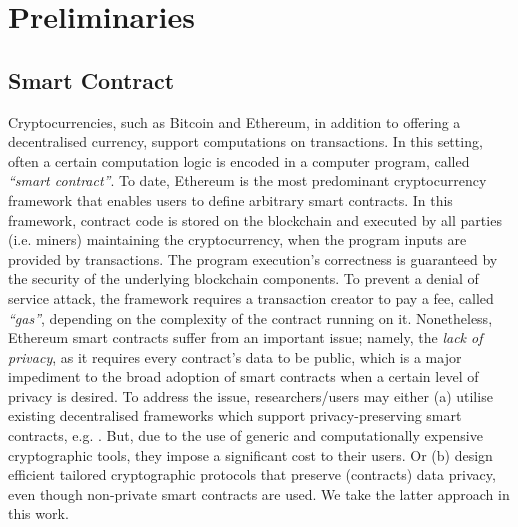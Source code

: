 


\section{Preliminaries} 




\subsection{Smart Contract} Cryptocurrencies, such as Bitcoin and Ethereum, in addition to offering a decentralised currency,  support  computations on  transactions. In this setting, often a certain computation logic is encoded in a computer program, called \emph{``smart contract''}. To date, Ethereum is the most predominant cryptocurrency framework that enables users to define arbitrary smart contracts. In this framework,  contract code is stored on the blockchain and  executed by all parties (i.e. miners) maintaining the cryptocurrency,  when the program inputs are provided by transactions. The program execution's  correctness  is  guaranteed by the security of the underlying blockchain components. To prevent  a denial of service attack, the framework requires a transaction creator to pay a  fee, called \emph{``gas''}, depending on the complexity of the contract running on  it.  Nonetheless,  Ethereum smart contracts suffer from an important   issue; namely, the \emph{lack of privacy}, as it requires  every contract's data to be public, which is a major impediment  to  the broad adoption of  smart contracts when a certain level of privacy is desired. To address the issue, researchers/users may either (a)  utilise existing decentralised frameworks  which support privacy-preserving smart contracts, e.g. \cite{KosbaMSWP16}. But, due to the use of generic and computationally expensive cryptographic tools,  they impose a significant cost to their users. Or (b)  design  efficient tailored cryptographic protocols  that preserve (contracts) data privacy, even though non-private smart contracts are used. We take the latter approach in this work. 




